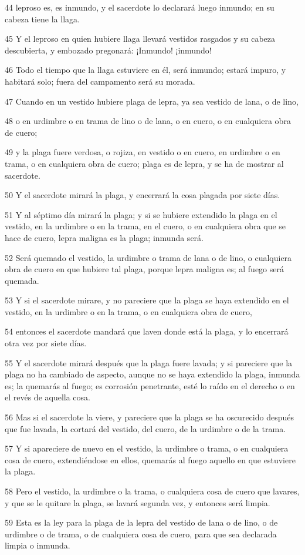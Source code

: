 \par 44 leproso es, es inmundo, y el sacerdote lo declarará luego inmundo; en su cabeza tiene la llaga.
\par 45 Y el leproso en quien hubiere llaga llevará vestidos rasgados y su cabeza descubierta, y embozado pregonará: ¡Inmundo! ¡inmundo!
\par 46 Todo el tiempo que la llaga estuviere en él, será inmundo; estará impuro, y habitará solo; fuera del campamento será su morada.
\par 47 Cuando en un vestido hubiere plaga de lepra, ya sea vestido de lana, o de lino,
\par 48 o en urdimbre o en trama de lino o de lana, o en cuero, o en cualquiera obra de cuero;
\par 49 y la plaga fuere verdosa, o rojiza, en vestido o en cuero, en urdimbre o en trama, o en cualquiera obra de cuero; plaga es de lepra, y se ha de mostrar al sacerdote.
\par 50 Y el sacerdote mirará la plaga, y encerrará la cosa plagada por siete días.
\par 51 Y al séptimo día mirará la plaga; y si se hubiere extendido la plaga en el vestido, en la urdimbre o en la trama, en el cuero, o en cualquiera obra que se hace de cuero, lepra maligna es la plaga; inmunda será.
\par 52 Será quemado el vestido, la urdimbre o trama de lana o de lino, o cualquiera obra de cuero en que hubiere tal plaga, porque lepra maligna es; al fuego será quemada.
\par 53 Y si el sacerdote mirare, y no pareciere que la plaga se haya extendido en el vestido, en la urdimbre o en la trama, o en cualquiera obra de cuero,
\par 54 entonces el sacerdote mandará que laven donde está la plaga, y lo encerrará otra vez por siete días.
\par 55 Y el sacerdote mirará después que la plaga fuere lavada; y si pareciere que la plaga no ha cambiado de aspecto, aunque no se haya extendido la plaga, inmunda es; la quemarás al fuego; es corrosión penetrante, esté lo raído en el derecho o en el revés de aquella cosa.
\par 56 Mas si el sacerdote la viere, y pareciere que la plaga se ha oscurecido después que fue lavada, la cortará del vestido, del cuero, de la urdimbre o de la trama.
\par 57 Y si apareciere de nuevo en el vestido, la urdimbre o trama, o en cualquiera cosa de cuero, extendiéndose en ellos, quemarás al fuego aquello en que estuviere la plaga.
\par 58 Pero el vestido, la urdimbre o la trama, o cualquiera cosa de cuero que lavares, y que se le quitare la plaga, se lavará segunda vez, y entonces será limpia.
\par 59 Esta es la ley para la plaga de la lepra del vestido de lana o de lino, o de urdimbre o de trama, o de cualquiera cosa de cuero, para que sea declarada limpia o inmunda.

